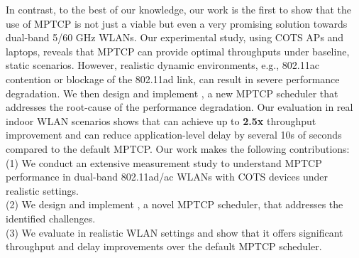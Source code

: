 In contrast, to the best of our knowledge, our work is the first to 
show that the use of MPTCP is not just a viable but even a very promising solution
towards dual-band 5/60 GHz WLANs. 
Our experimental study, using COTS APs and laptops, reveals that 
MPTCP can provide optimal throughputs under baseline, static scenarios.
However, realistic dynamic environments, e.g., 802.11ac contention or 
blockage of the 802.11ad link, 
can result in severe performance degradation. We then design and implement \name, a new
MPTCP scheduler that addresses the root-cause of the performance
degradation.
Our evaluation in real
indoor WLAN scenarios shows that \name can achieve up to \textbf{2.5x}
throughput improvement and can reduce application-level delay by several
10s of seconds compared to the default MPTCP.
Our work makes the following contributions:
\\
(1) We conduct an extensive measurement study to understand MPTCP
performance in dual-band 802.11ad/ac WLANs with COTS devices under
realistic settings.
\\
(2) We design and implement \name, a novel MPTCP scheduler, that
addresses the identified challenges.
\\
(3) We evaluate \name in realistic WLAN settings and show that it
offers significant throughput and delay improvements over the default
MPTCP scheduler.
\fi
